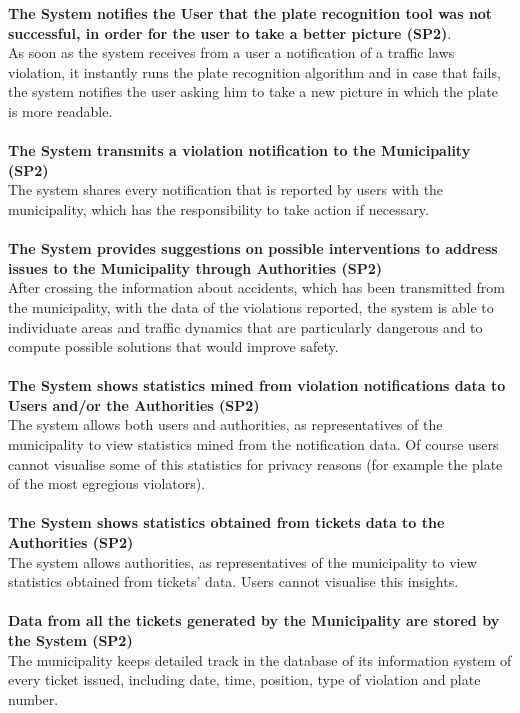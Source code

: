 \documentclass {article}
\begin{document}
	{\bf The System notifies the User that the plate recognition tool was not successful, in order for the user to take a better picture (SP2)}. \\
		As soon as the system receives from a user a notification of a traffic laws violation, it instantly runs the plate recognition algorithm and in case that fails, the system notifies the user asking him to take a new picture in which the plate is more readable. \\ \\
	{\bf The System transmits a violation notification to the Municipality (SP2)} \\
		The system shares every notification that is reported by users with the municipality, which has the responsibility to take action if necessary.\\ \\
	{\bf The System provides suggestions on possible interventions to address issues to the Municipality through Authorities (SP2)} \\
		After crossing the information about accidents, which has been transmitted from the municipality, with the data of the violations reported, the system is able to individuate areas and traffic dynamics that are particularly dangerous and to compute possible solutions that would improve safety. \\ \\
	{\bf The System shows statistics mined from violation notifications data to Users and/or the Authorities (SP2)} \\
		The system allows both users and authorities, as representatives of the municipality to view statistics mined from the notification data. Of course users cannot visualise some of this statistics for privacy reasons (for example the plate of the most egregious violators). \\ \\
	{\bf The System shows statistics obtained from tickets data to the Authorities (SP2)}\\
		The system allows authorities, as representatives of the municipality to view statistics obtained from tickets' data. Users cannot visualise this insights. \\ \\
	{\bf Data from all the tickets generated by the Municipality are stored by the System (SP2)}\\
		The municipality keeps detailed track in the database of its information system of every ticket issued, including date, time, position, type of violation and plate number.\\ \\
\end{document}
